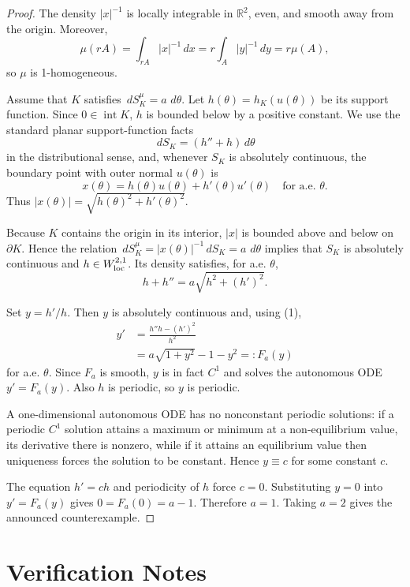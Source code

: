 \documentclass[11pt]{article}
\newcommand{\R}{\mathbb{R}}
\newcommand{\dd}{\,d}
\begin{document}
\begin{proof}
The density \(|x|^{-1}\) is locally integrable in \(\R^2\), even, and smooth
away from the origin.  Moreover,
\[
  \mu(rA)=\int_{rA}|x|^{-1}\dd x
  =r\int_A |y|^{-1}\dd y
  =r\mu(A),
\]
so \(\mu\) is 1-homogeneous.

Assume that \(K\) satisfies \(\dd S^\mu_K=a\,\dd\theta\).  Let
\(h(\theta)=h_K(u(\theta))\) be its support function.  Since \(0\in
\operatorname{int}K\), \(h\) is bounded below by a positive constant.  We use
the standard planar support-function facts
\[
  \dd S_K = (h''+h)\dd\theta
\]
in the distributional sense, and, whenever \(S_K\) is absolutely continuous,
the boundary point with outer normal \(u(\theta)\) is
\[
  x(\theta)=h(\theta)u(\theta)+h'(\theta)u'(\theta)
  \quad\text{for a.e. }\theta.
\]
Thus \(|x(\theta)|=\sqrt{h(\theta)^2+h'(\theta)^2}\).

Because \(K\) contains the origin in its interior, \(|x|\) is bounded above
and below on \(\partial K\).  Hence the relation
\(\dd S^\mu_K=|x(\theta)|^{-1}\dd S_K=a\,\dd\theta\) implies that
\(S_K\) is absolutely continuous and \(h\in W^{2,1}_{\rm loc}\).  Its density
satisfies, for a.e. \(\theta\),
\[
  h+h''=a\sqrt{h^2+(h')^2}. \tag{1}
\]

Set \(y=h'/h\).  Then \(y\) is absolutely continuous and, using (1),
\[
\begin{aligned}
  y'
  &=\frac{h''h-(h')^2}{h^2}  \\
  &= a\sqrt{1+y^2}-1-y^2
  =:F_a(y)
\end{aligned}
\]
for a.e. \(\theta\).  Since \(F_a\) is smooth, \(y\) is in fact \(C^1\) and
solves the autonomous ODE \(y'=F_a(y)\).  Also \(h\) is periodic, so \(y\) is
periodic.

A one-dimensional autonomous ODE has no nonconstant periodic solutions: if a
periodic \(C^1\) solution attains a maximum or minimum at a non-equilibrium
value, its derivative there is nonzero, while if it attains an equilibrium
value then uniqueness forces the solution to be constant.  Hence \(y\equiv c\)
for some constant \(c\).

The equation \(h'=ch\) and periodicity of \(h\) force \(c=0\).  Substituting
\(y=0\) into \(y'=F_a(y)\) gives \(0=F_a(0)=a-1\).  Therefore \(a=1\).
Taking \(a=2\) gives the announced counterexample.
\end{proof}

\section*{Verification Notes}
\end{document}
